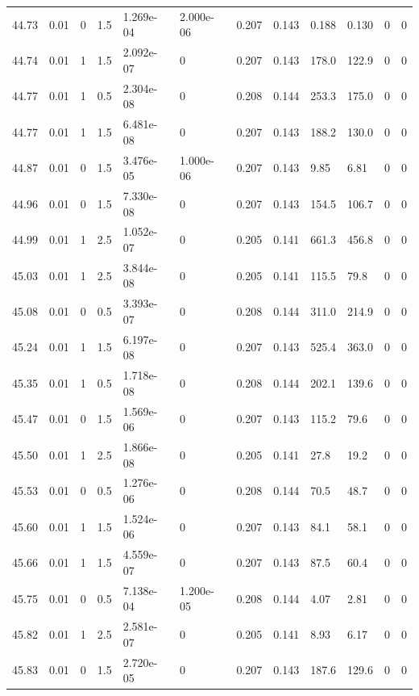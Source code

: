 \documentclass[preview]{standalone}
\begin{document}
{{{{{{{{{{{{{{\begin{tabular}{L{1.2cm}C{1.2cm} C{0.3cm}C{0.5cm} C{1.4cm}C{1.4cm} C{1.4cm}C{1.4cm} C{1.6cm}C{1.6cm} C{1.6cm}C{1.6cm}}
  44.73  &  0.01  & 0     & 1.5 &  1.269e-04  & 2.000e-06  &  0.207&   0.143& 0.188 & 0.130   &  0 & 0  \\ 
  44.74  &  0.01  & 1     & 1.5 &  2.092e-07  & 0  &  0.207&   0.143& 178.0 & 122.9   &  0 & 0  \\ 
  44.77  &  0.01  & 1     & 0.5 &  2.304e-08  & 0  &  0.208&   0.144& 253.3 & 175.0   &  0 & 0  \\ 
  44.77  &  0.01  & 1     & 1.5 &  6.481e-08  & 0  &  0.207&   0.143& 188.2 & 130.0   &  0 & 0  \\ 
  44.87  &  0.01  & 0     & 1.5 &  3.476e-05  & 1.000e-06  &  0.207&   0.143& 9.85 & 6.81   &  0 & 0  \\ 
  44.96  &  0.01  & 0     & 1.5 &  7.330e-08  & 0  &  0.207&   0.143& 154.5 & 106.7   &  0 & 0  \\ 
  44.99  &  0.01  & 1     & 2.5 &  1.052e-07  & 0  &  0.205&   0.141& 661.3 & 456.8   &  0 & 0  \\ 
  45.03  &  0.01  & 1     & 2.5 &  3.844e-08  & 0  &  0.205&   0.141& 115.5 & 79.8   &  0 & 0  \\ 
  45.08  &  0.01  & 0     & 0.5 &  3.393e-07  & 0  &  0.208&   0.144& 311.0 & 214.9   &  0 & 0  \\ 
  45.24  &  0.01  & 1     & 1.5 &  6.197e-08  & 0  &  0.207&   0.143& 525.4 & 363.0   &  0 & 0  \\ 
  45.35  &  0.01  & 1     & 0.5 &  1.718e-08  & 0  &  0.208&   0.144& 202.1 & 139.6   &  0 & 0  \\ 
  45.47  &  0.01  & 0     & 1.5 &  1.569e-06  & 0  &  0.207&   0.143& 115.2 & 79.6   &  0 & 0  \\ 
  45.50  &  0.01  & 1     & 2.5 &  1.866e-08  & 0  &  0.205&   0.141& 27.8 & 19.2   &  0 & 0  \\ 
  45.53  &  0.01  & 0     & 0.5 &  1.276e-06  & 0  &  0.208&   0.144& 70.5 & 48.7   &  0 & 0  \\ 
  45.60  &  0.01  & 1     & 1.5 &  1.524e-06  & 0  &  0.207&   0.143& 84.1 & 58.1   &  0 & 0  \\ 
  45.66  &  0.01  & 1     & 1.5 &  4.559e-07  & 0  &  0.207&   0.143& 87.5 & 60.4   &  0 & 0  \\ 
  45.75  &  0.01  & 0     & 0.5 &  7.138e-04  & 1.200e-05  &  0.208&   0.144& 4.07 & 2.81   &  0 & 0  \\ 
  45.82  &  0.01  & 1     & 2.5 &  2.581e-07  & 0  &  0.205&   0.141& 8.93 & 6.17   &  0 & 0  \\ 
  45.83  &  0.01  & 0     & 1.5 &  2.720e-05  & 0  &  0.207&   0.143& 187.6 & 129.6   &  0 & 0  \\ 

\end{tabular}}}}}}}}}}}}}}}
\end{document}
